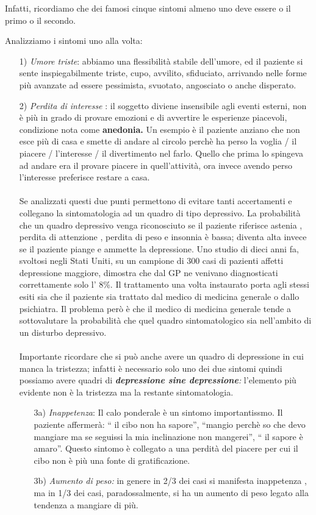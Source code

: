Infatti, ricordiamo che dei famosi cinque sintomi almeno uno deve essere
o il primo o il secondo.

Analizziamo i sintomi uno alla volta:
\begin{itemize}
\item[1)]
\emph{Umore triste}: abbiamo una flessibilità stabile dell'umore, ed
il paziente si sente inspiegabilmente triste, cupo, avvilito,
sfiduciato, arrivando nelle forme più avanzate ad essere pessimista,
svuotato, angosciato o anche disperato.
\item[2)]
\emph{Perdita di interesse} : il soggetto diviene insensibile agli
eventi esterni, non è più in grado di provare emozioni e di avvertire le
esperienze piacevoli, condizione nota come \textbf{anedonia.} Un esempio
è il paziente anziano che non esce più di casa e smette di andare al
circolo perchè ha perso la voglia / il piacere / l'interesse / il
divertimento nel farlo. Quello che prima lo spingeva ad andare era il
provare piacere in quell'attività, ora invece avendo perso l'interesse
preferisce restare a casa.
\\\\
Se analizzati questi due punti permettono di evitare tanti accertamenti
e collegano la sintomatologia ad un quadro di tipo depressivo. La
probabilità che un quadro depressivo venga riconosciuto se il paziente
riferisce astenia , perdita di attenzione , perdita di peso e insonnia è
bassa; diventa alta invece se il paziente piange e ammette la
depressione. Uno studio di dieci anni fa, svoltosi negli Stati Uniti, su
un campione di 300 casi di pazienti affetti depressione maggiore,
dimostra che dal GP ne venivano diagnosticati correttamente solo l' 8\%.
Il trattamento una volta instaurato porta agli stessi esiti sia che il
paziente sia trattato dal medico di medicina generale o dallo
psichiatra. Il problema però è che il medico di medicina generale tende
a sottovalutare la probabilità che quel quadro sintomatologico sia
nell'ambito di un disturbo depressivo.
\\\\
Importante ricordare che si può anche avere un quadro di depressione in
cui manca la tristezza; infatti è necessario solo uno dei due sintomi
quindi possiamo avere quadri di \emph{\textbf{depressione sine
depressione}:} l'elemento più evidente non è la tristezza ma la restante
sintomatologia.
\begin{itemize}
\item[3a)]
\emph{Inappetenza}: Il calo ponderale è un sintomo importantissmo. Il
paziente affermerà: `` il cibo non ha sapore'', ``mangio perchè so che
devo mangiare ma se seguissi la mia inclinazione non mangerei'', `` il
sapore è amaro''. Questo sintomo è collegato a una perdità del piacere
per cui il cibo non è più una fonte di gratificazione.
\item[3b)]
\emph{Aumento di peso:} in genere in 2/3 dei casi si manifesta
inappetenza , ma in 1/3 dei casi, paradossalmente, si ha un aumento di
peso legato alla tendenza a mangiare di più.
\end{itemize}


\end{itemize}
